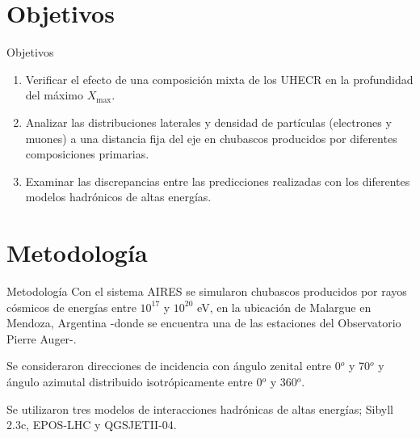 \documentclass[11pt,table,compress]{beamer}
\begin{document}
\section{Objetivos}
\begin{frame}{Objetivos}
	\begin{enumerate}
		\item Verificar el efecto de una composición mixta de los UHECR en la profundidad del máximo $X_{\text{max}}$. \vspace{0.5cm}
		
		\item Analizar las distribuciones laterales y densidad de partículas (electrones y muones) a una distancia fija del eje en chubascos 				producidos por diferentes composiciones primarias. \vspace{0.5cm}
		
		\item Examinar las discrepancias entre las predicciones realizadas con los diferentes modelos hadrónicos de altas energías.
	\end{enumerate}	
\end{frame}

\section{Metodología}
\begin{frame}{Metodología}
Con el sistema AIRES se simularon chubascos producidos por rayos cósmicos de energías entre $10^{17}$ y $10^{20}$ eV, en la ubicación de Malargue en Mendoza, Argentina -donde se encuentra una de las estaciones del Observatorio Pierre Auger-. \\ \vspace{0.5 cm}

Se consideraron direcciones de incidencia con ángulo zenital entre 0$^{o}$ y 70$^{o}$ y ángulo azimutal distribuido isotrópicamente entre 0$^{o}$ y 360$^{o}$. \\ \vspace{0.5 cm}

Se utilizaron tres modelos de interacciones hadrónicas de altas energías; Sibyll 2.3c, EPOS-LHC y QGSJETII-04.
\end{frame}
\end{document}
